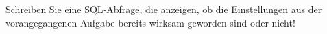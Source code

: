 \item Schreiben Sie eine SQL-Abfrage, die anzeigen, ob die Einstellungen
aus der vorangegangenen Aufgabe bereits wirksam geworden sind oder
nicht!
